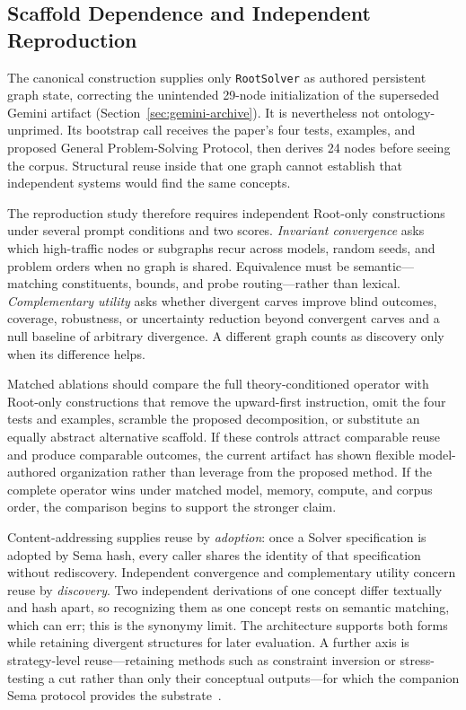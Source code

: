 \documentclass[11pt]{article}
\let\oldtexttt\texttt
\renewcommand{\texttt}[1]{\oldtexttt{\small #1}}
\begin{document}
\subsection{Scaffold Dependence and Independent Reproduction}
\label{sec:reuse-discovery}

The canonical construction supplies only \texttt{RootSolver} as authored persistent graph state, correcting the unintended 29-node initialization of the superseded Gemini artifact (Section~\ref{sec:gemini-archive}). It is nevertheless not ontology-unprimed. Its bootstrap call receives the paper's four tests, examples, and proposed General Problem-Solving Protocol, then derives 24 nodes before seeing the corpus. Structural reuse inside that one graph cannot establish that independent systems would find the same concepts.

The reproduction study therefore requires independent Root-only constructions under several prompt conditions and two scores. \emph{Invariant convergence} asks which high-traffic nodes or subgraphs recur across models, random seeds, and problem orders when no graph is shared. Equivalence must be semantic---matching constituents, bounds, and probe routing---rather than lexical. \emph{Complementary utility} asks whether divergent carves improve blind outcomes, coverage, robustness, or uncertainty reduction beyond convergent carves and a null baseline of arbitrary divergence. A different graph counts as discovery only when its difference helps.

Matched ablations should compare the full theory-conditioned operator with Root-only constructions that remove the upward-first instruction, omit the four tests and examples, scramble the proposed decomposition, or substitute an equally abstract alternative scaffold. If these controls attract comparable reuse and produce comparable outcomes, the current artifact has shown flexible model-authored organization rather than leverage from the proposed method. If the complete operator wins under matched model, memory, compute, and corpus order, the comparison begins to support the stronger claim.

Content-addressing supplies reuse by \emph{adoption}: once a Solver specification is adopted by Sema hash, every caller shares the identity of that specification without rediscovery. Independent convergence and complementary utility concern reuse by \emph{discovery}. Two independent derivations of one concept differ textually and hash apart, so recognizing them as one concept rests on semantic matching, which can err; this is the synonymy limit. The architecture supports both forms while retaining divergent structures for later evaluation. A further axis is strategy-level reuse---retaining methods such as constraint inversion or stress-testing a cut rather than only their conceptual outputs---for which the companion Sema protocol provides the substrate~\cite{westerberg2026sema}.
\end{document}
